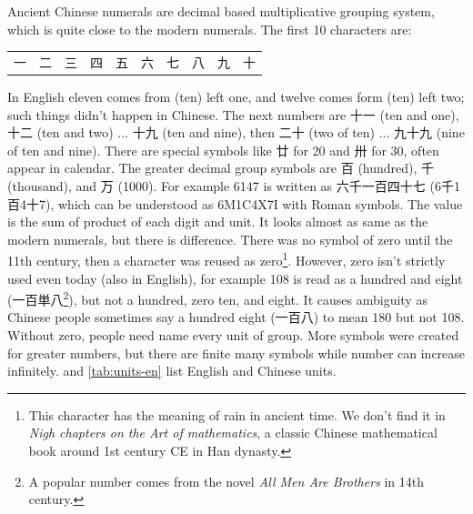 \documentclass[b5paper]{article}
\begin{document}
Ancient Chinese numerals are decimal based multiplicative grouping system, which is quite close to the modern numerals. The first 10 characters are:

\begin{center}
\begin{tabular}{cccccccccc}
{一} & {二} & {三} & {四} & {五} & {六} & {七} & {八} & {九} & {十} \\
\end{tabular}
\end{center}

In English eleven comes from (ten) left one, and twelve comes form (ten) left two; such things didn't happen in Chinese. The next numbers are {十一} (ten and one), {十二} (ten and two) ... {十九} (ten and nine), then {二十} (two of ten) ... {九十九} (nine of ten and nine). There are special symbols like {廿} for 20 and {卅} for 30, often appear in calendar. The greater decimal group symbols are {百} (hundred), {千} (thousand), and {万} (1000). For example 6147 is written as {六千一百四十七 (6千1百4十7)}, which can be understood as 6M1C4X7I with Roman symbols. The value is the sum of product of each digit and unit. It looks almost as same as the modern numerals, but there is difference. There was no symbol of zero until the 11th century, then a character was reused as zero\footnote{This character has the meaning of rain in ancient time. We don't find it in {\em Nigh chapters on the Art of mathematics}, a classic Chinese mathematical book around 1st century CE in Han dynasty.}. However, zero isn't strictly used even today (also in English), for example 108 is read as a hundred and eight (一百単八\footnote{A popular number comes from the novel {\em All Men Are Brothers} in 14th century.}), but not a hundred, zero ten, and eight. It causes ambiguity as Chinese people sometimes say a hundred eight (一百八) to mean 180 but not 108. Without zero, people need name every unit of group. More symbols were created for greater numbers, but there are finite many symbols while number can increase infinitely.  and \cref{tab:units-en} list English and Chinese units.
\end{document}
